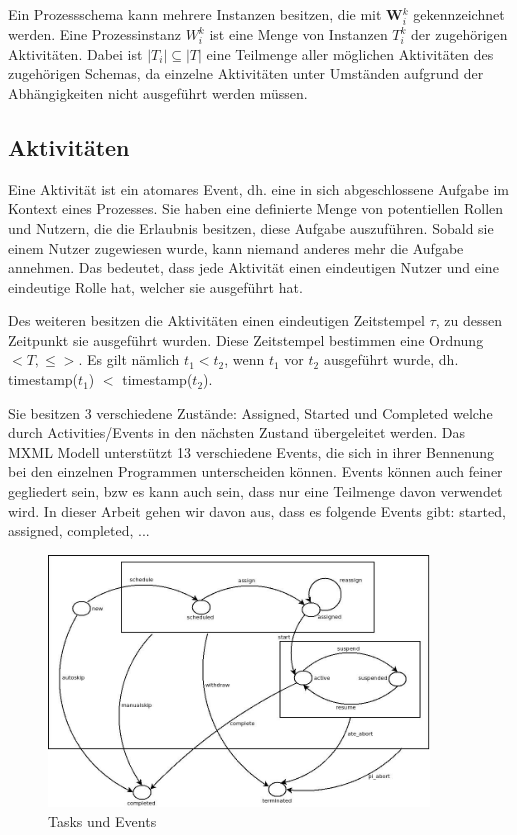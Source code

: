 Ein Prozessschema kann mehrere Instanzen besitzen, die mit \textbf{W$_i^k$} gekennzeichnet werden.
Eine Prozessinstanz $W_i^k$ ist eine Menge von Instanzen $T_i^k$ der zugehörigen Aktivitäten. Dabei ist $|T_i| \subseteq |T|$ eine Teilmenge aller möglichen Aktivitäten des zugehörigen Schemas, da einzelne Aktivitäten unter Umständen aufgrund der Abhängigkeiten nicht ausgeführt werden müssen.


\subsection{Aktivitäten}
Eine Aktivität ist ein atomares Event, dh. eine in sich abgeschlossene Aufgabe im Kontext eines Prozesses. Sie haben eine definierte Menge von potentiellen Rollen und Nutzern, die die Erlaubnis besitzen, diese Aufgabe auszuführen. Sobald sie einem Nutzer zugewiesen wurde, kann niemand anderes mehr die Aufgabe annehmen. Das bedeutet, dass jede Aktivität einen eindeutigen Nutzer und eine eindeutige Rolle hat, welcher sie ausgeführt hat.

Des weiteren besitzen die Aktivitäten einen eindeutigen Zeitstempel $\tau$, zu dessen Zeitpunkt sie ausgeführt wurden. Diese Zeitstempel bestimmen eine Ordnung $<T, \leq>$. Es gilt nämlich $t_1 < t_2 $, wenn $t_1$ vor $t_2$ ausgeführt wurde, dh. timestamp($t_1$) $<$ timestamp($t_2$).


Sie besitzen 3 verschiedene Zustände: Assigned, Started und Completed welche durch Activities/Events in den nächsten Zustand übergeleitet werden. Das MXML Modell unterstützt 13 verschiedene Events, die sich in ihrer Bennenung bei den einzelnen Programmen unterscheiden können. Events können auch feiner gegliedert sein, bzw es kann auch sein, dass nur eine Teilmenge davon verwendet wird. In dieser Arbeit gehen wir davon aus, dass es folgende Events gibt: started, assigned, completed, ...




\begin{figure}[ht]
	\centering
  \includegraphics[width=0.9\textwidth]{Figures/Taskevents}
	\caption{Tasks und Events}
	\label{fig2}
\end{figure}
 

